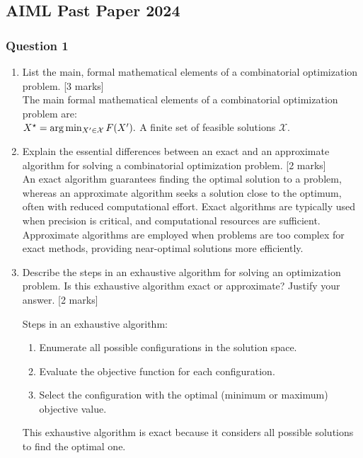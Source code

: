 
\subsection{AIML Past Paper 2024}
\subsubsection{Question 1}
\begin{enumerate}
    \item[(a)] List the main, formal mathematical elements of a combinatorial optimization problem. [3 marks] \\
    {\color{blue}
    The main formal mathematical elements of a combinatorial optimization problem are: \\
    \begin{math}
    X^\star = \arg\min_{X' \in \mathcal{X}} F(X'). \\
    \end{math}
        A finite set of feasible solutions $\mathcal{X}$. \\
    } 
    \item[(b)] Explain the essential differences between an exact and an approximate algorithm for solving a combinatorial optimization problem. [2 marks] \\
    {\color{blue}
    An exact algorithm guarantees finding the optimal solution to a problem, whereas an approximate algorithm seeks a solution close to the optimum, often with reduced computational effort. Exact algorithms are typically used when precision is critical, and computational resources are sufficient. Approximate algorithms are employed when problems are too complex for exact methods, providing near-optimal solutions more efficiently.
    } 
    \item[(c)] Describe the steps in an exhaustive algorithm for solving an optimization problem. Is this exhaustive algorithm exact or approximate? Justify your answer. [2 marks] \\
    {\color{blue}
    Steps in an exhaustive algorithm:
    \begin{enumerate}
        \item Enumerate all possible configurations in the solution space.
        \item Evaluate the objective function for each configuration.
        \item Select the configuration with the optimal (minimum or maximum) objective value.
    \end{enumerate}
    This exhaustive algorithm is exact because it considers all possible solutions to find the optimal one.
}
\end{enumerate}
